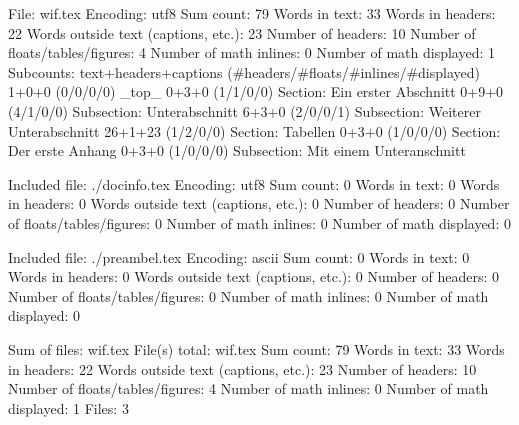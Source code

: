 File: wif.tex
Encoding: utf8
Sum count: 79
Words in text: 33
Words in headers: 22
Words outside text (captions, etc.): 23
Number of headers: 10
Number of floats/tables/figures: 4
Number of math inlines: 0
Number of math displayed: 1
Subcounts:
  text+headers+captions (#headers/#floats/#inlines/#displayed)
  1+0+0 (0/0/0/0) _top_
  0+3+0 (1/1/0/0) Section: Ein erster Abschnitt
  0+9+0 (4/1/0/0) Subsection: Unterabschnitt
  6+3+0 (2/0/0/1) Subsection: Weiterer Unterabschnitt
  26+1+23 (1/2/0/0) Section: Tabellen
  0+3+0 (1/0/0/0) Section: Der erste Anhang
  0+3+0 (1/0/0/0) Subsection: Mit einem Unteranschnitt

Included file: ./docinfo.tex
Encoding: utf8
Sum count: 0
Words in text: 0
Words in headers: 0
Words outside text (captions, etc.): 0
Number of headers: 0
Number of floats/tables/figures: 0
Number of math inlines: 0
Number of math displayed: 0

Included file: ./preambel.tex
Encoding: ascii
Sum count: 0
Words in text: 0
Words in headers: 0
Words outside text (captions, etc.): 0
Number of headers: 0
Number of floats/tables/figures: 0
Number of math inlines: 0
Number of math displayed: 0

Sum of files: wif.tex
File(s) total: wif.tex
Sum count: 79
Words in text: 33
Words in headers: 22
Words outside text (captions, etc.): 23
Number of headers: 10
Number of floats/tables/figures: 4
Number of math inlines: 0
Number of math displayed: 1
Files: 3

